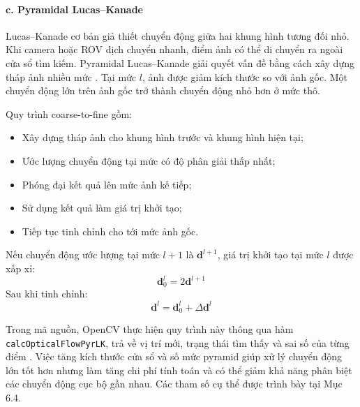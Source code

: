 \documentclass[../DoAn.tex]{subfiles}
\begin{document}
\paragraph{c. Pyramidal Lucas--Kanade}
Lucas--Kanade cơ bản giả thiết chuyển động giữa hai khung hình tương đối nhỏ. Khi camera hoặc ROV dịch chuyển nhanh, điểm ảnh có thể di chuyển ra ngoài cửa sổ tìm kiếm. Pyramidal Lucas--Kanade giải quyết vấn đề bằng cách xây dựng tháp ảnh nhiều mức \cite{opencv_optical_flow}. Tại mức $l$, ảnh được giảm kích thước so với ảnh gốc. Một chuyển động lớn trên ảnh gốc trở thành chuyển động nhỏ hơn ở mức thô.

Quy trình coarse-to-fine gồm:
\begin{itemize}
    \item Xây dựng tháp ảnh cho khung hình trước và khung hình hiện tại;
    \item Ước lượng chuyển động tại mức có độ phân giải thấp nhất;
    \item Phóng đại kết quả lên mức ảnh kế tiếp;
    \item Sử dụng kết quả làm giá trị khởi tạo;
    \item Tiếp tục tinh chỉnh cho tới mức ảnh gốc.
\end{itemize}

Nếu chuyển động ước lượng tại mức $l+1$ là $\mathbf{d}^{l+1}$, giá trị khởi tạo tại mức $l$ được xấp xỉ:
\[
\mathbf{d}_{0}^{l} = 2\mathbf{d}^{l+1}
\]
Sau khi tinh chỉnh:
\[
\mathbf{d}^{l} = \mathbf{d}_{0}^{l} + \Delta\mathbf{d}^{l}
\]

Trong mã nguồn, OpenCV thực hiện quy trình này thông qua hàm \texttt{calcOpticalFlowPyrLK}, trả về vị trí mới, trạng thái tìm thấy và sai số của từng điểm \cite{opencv_optical_flow}. Việc tăng kích thước cửa sổ và số mức pyramid giúp xử lý chuyển động lớn tốt hơn nhưng làm tăng chi phí tính toán và có thể giảm khả năng phân biệt các chuyển động cục bộ gần nhau. Các tham số cụ thể được trình bày tại Mục 6.4.
\end{document}
